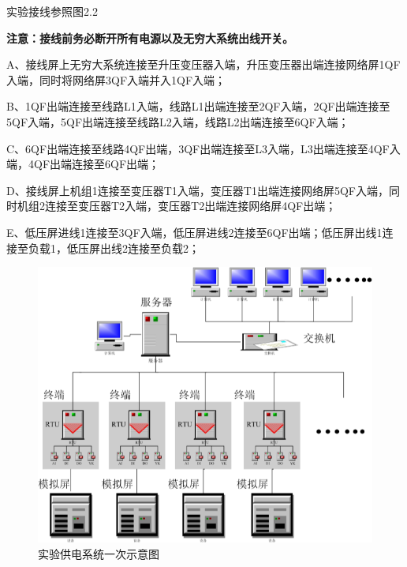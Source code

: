 \documentclass[a4paper]{ctexrep}
\begin{document}
                实验接线参照图2.2

                \textbf{注意：接线前务必断开所有电源以及无穷大系统出线开关。}

                A、接线屏上无穷大系统连接至升压变压器入端，升压变压器出端连接网络屏1QF入端，同时将网络屏3QF入端并入1QF入端；
               
                B、1QF出端连接至线路L1入端，线路L1出端连接至2QF入端，2QF出端连接至5QF入端，5QF出端连接至线路L2入端，线路L2出端连接至6QF入端；
                
                C、6QF出端连接至线路4QF出端，3QF出端连接至L3入端，L3出端连接至4QF入端，4QF出端连接至6QF出端；
               
                D、接线屏上机组1连接至变压器T1入端，变压器T1出端连接网络屏5QF入端，同时机组2连接至变压器T2入端，变压器T2出端连接网络屏4QF出端；
                
                E、低压屏进线1连接至3QF入端，低压屏进线2连接至6QF出端；低压屏出线1连接至负载1，低压屏出线2连接至负载2；

                \begin{figure}[htbp]
                    \centering
                    \includegraphics[width=12cm]{1.png}
                    \caption{实验供电系统一次示意图}
                \end{figure}
\end{document}
